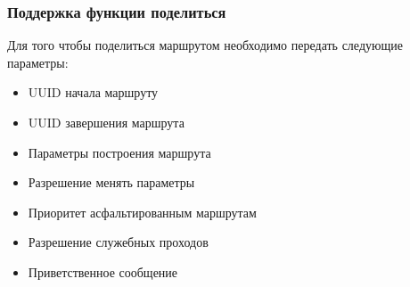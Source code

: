   \subsubsection{Поддержка функции поделиться}
    Для того чтобы поделиться маршрутом необходимо передать следующие параметры:
    \begin{itemize}
      \item UUID начала маршруту
      \item UUID завершения маршрута
      \item Параметры построения маршрута
      \item Разрешение менять параметры
      \item Приоритет асфальтированным маршрутам
      \item Разрешение служебных проходов
      \item Приветственное сообщение
    \end{itemize}

